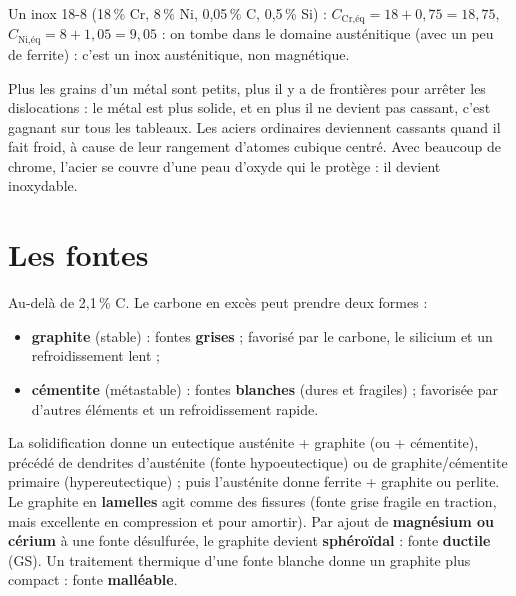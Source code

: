 
\begin{exbox}[title={Exemple chiffré (pas dans les diapositives)}]
Un inox 18-8 (18\,\% Cr, 8\,\% Ni, 0,05\,\% C, 0,5\,\% Si) : $C_{\text{Cr,éq}} = 18 + 0{,}75 = 18{,}75$,
$C_{\text{Ni,éq}} = 8 + 1{,}05 = 9{,}05$ : on tombe dans le domaine austénitique (avec un peu de
ferrite) : c'est un inox austénitique, non magnétique.
\end{exbox}

\begin{goatbox}
Plus les grains d'un métal sont petits, plus il y a de frontières pour arrêter les dislocations :
le métal est plus solide, et en plus il ne devient pas cassant, c'est gagnant sur tous les
tableaux. Les aciers ordinaires deviennent cassants quand il fait froid, à cause de leur
rangement d'atomes cubique centré. Avec beaucoup de chrome, l'acier se couvre d'une peau d'oxyde
qui le protège : il devient inoxydable.
\end{goatbox}

\section{Les fontes}

Au-delà de 2,1\,\% C. Le carbone en excès peut prendre deux formes :
\begin{itemize}
  \item \textbf{graphite} (stable) : fontes \textbf{grises} ; favorisé par le carbone, le
        silicium et un refroidissement lent ;
  \item \textbf{cémentite} (métastable) : fontes \textbf{blanches} (dures et fragiles) ; favorisée
        par d'autres éléments et un refroidissement rapide.
\end{itemize}


La solidification donne un eutectique austénite + graphite (ou + cémentite), précédé de dendrites
d'austénite (fonte hypoeutectique) ou de graphite/cémentite primaire (hypereutectique) ; puis
l'austénite donne ferrite + graphite ou perlite. Le graphite en \textbf{lamelles} agit comme des
fissures (fonte grise fragile en traction, mais excellente en compression et pour amortir).
Par ajout de \textbf{magnésium ou cérium} à une fonte désulfurée, le graphite devient
\textbf{sphéroïdal} : fonte \textbf{ductile} (GS). Un traitement thermique d'une fonte blanche donne
un graphite plus compact : fonte \textbf{malléable}.

